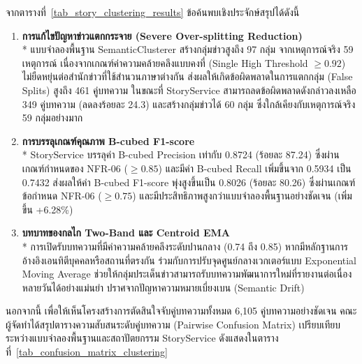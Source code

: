 จากตารางที่~\ref{tab_story_clustering_results} ข้อค้นพบเชิงประจักษ์สรุปได้ดังนี้
\begin{enumerate}
    \item \textbf{การแก้ไขปัญหาข่าวแตกกระจาย (Severe Over-splitting Reduction)}\\*
    แบบจำลองพื้นฐาน SemanticClusterer สร้างกลุ่มข่าวสูงถึง 97 กลุ่ม จากเหตุการณ์จริง 59 เหตุการณ์ เนื่องจากเกณฑ์ค่าความคล้ายคลึงแบบคงที่ (Single High Threshold $\ge 0.92$) ไม่ยืดหยุ่นต่อสำนักข่าวที่ใช้สำนวนภาษาต่างกัน ส่งผลให้เกิดข้อผิดพลาดในการแตกกลุ่ม (False Splits) สูงถึง 461 คู่บทความ ในขณะที่ StoryService สามารถลดข้อผิดพลาดดังกล่าวลงเหลือ 349 คู่บทความ (ลดลงร้อยละ 24.3) และสร้างกลุ่มข่าวได้ 60 กลุ่ม ซึ่งใกล้เคียงกับเหตุการณ์จริง 59 กลุ่มอย่างมาก
    \item \textbf{การบรรลุเกณฑ์คุณภาพ B-cubed F1-score}\\*
    StoryService บรรลุค่า B-cubed Precision เท่ากับ 0.8724 (ร้อยละ 87.24) ซึ่งผ่านเกณฑ์กำหนดของ NFR-06 ($\ge 0.85$) และมีค่า B-cubed Recall เพิ่มขึ้นจาก 0.5934 เป็น 0.7432 ส่งผลให้ค่า B-cubed F1-score พุ่งสูงขึ้นเป็น 0.8026 (ร้อยละ 80.26) ซึ่งผ่านเกณฑ์ข้อกำหนด NFR-06 ($\ge 0.75$) และมีประสิทธิภาพสูงกว่าแบบจำลองพื้นฐานอย่างชัดเจน (เพิ่มขึ้น +6.28\%)
    \item \textbf{บทบาทของกลไก Two-Band และ Centroid EMA}\\*
    การเปิดรับบทความที่มีค่าความคล้ายคลึงระดับปานกลาง (0.74 ถึง 0.85) หากมีหลักฐานการอ้างอิงเอนทิตีบุคคลหรือสถานที่ตรงกัน ร่วมกับการปรับจุดศูนย์กลางเวกเตอร์แบบ Exponential Moving Average ช่วยให้กลุ่มประเด็นข่าวสามารถรับบทความพัฒนาการใหม่ที่รายงานต่อเนื่องหลายวันได้อย่างแม่นยำ ปราศจากปัญหาความหมายเบี่ยงเบน (Semantic Drift)
\end{enumerate}

นอกจากนี้ เพื่อให้เห็นโครงสร้างการตัดสินใจจับคู่บทความทั้งหมด 6,105 คู่บทความอย่างชัดเจน คณะผู้จัดทำได้สรุปตารางความสับสนระดับคู่บทความ (Pairwise Confusion Matrix) เปรียบเทียบระหว่างแบบจำลองพื้นฐานและสถาปัตยกรรม StoryService ดังแสดงในตารางที่~\ref{tab_confusion_matrix_clustering}

